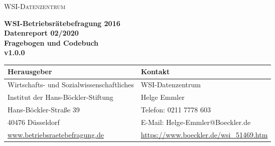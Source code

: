 \begin{titlepage}
\begin{center}
\vspace*{7.0cm}
\textsc{WSI-Datenzentrum} \\ 
\vspace*{2.0cm}

		\textbf{\LARGE WSI-Betriebsrätebefragung 2016}\\
\vspace*{1cm}
		\textbf{\large Datenreport 02/2020} \\ 
		\vspace*{0.175cm} \textbf{\large Fragebogen und Codebuch} \\
		\vspace*{0.175cm} \textbf{\large v1.0.0} \\
 
\vspace{3cm}
	
		

\end{center}		

\newpage

\thispagestyle{empty}

\vspace*{\fill}
\begin{tabular}[b]{L{9cm}  L{7.5cm}   }
\textbf{Herausgeber} & \textbf{Kontakt} \\
\toprule
Wirtschafts- und Sozialwissenschaftliches  & WSI-Datenzentrum  \\
 Institut der Hans-Böckler-Stiftung & Helge Emmler \\ 
 	Hans-Böckler-Straße 39  & Telefon: 0211 7778 603  \\
		40476 Düsseldorf  & E-Mail: Helge-Emmler@Boeckler.de \\
		\url{www.betriebsraetebefragung.de}& \url{https://www.boeckler.de/wsi_51469.htm}\\
\end{tabular}
		
					

\end{titlepage}